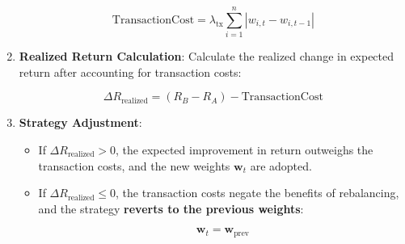 \begin{enumerate}
    \[
    \text{TransactionCost} = \lambda_{\text{tx}} \sum_{i=1}^n |w_{i, t} - w_{i, t-1}|
    \]

    \item \textbf{Realized Return Calculation}: Calculate the realized change in expected return after accounting for transaction costs:

    \[
    \Delta R_{\text{realized}} = (R_B - R_A) - \text{TransactionCost}
    \]

    \item \textbf{Strategy Adjustment}:
    \begin{itemize}
        \item If \( \Delta R_{\text{realized}} > 0 \), the expected improvement in return outweighs the transaction costs, and the new weights \( \mathbf{w}_t \) are adopted.
        \item If \( \Delta R_{\text{realized}} \leq 0 \), the transaction costs negate the benefits of rebalancing, and the strategy \textbf{reverts to the previous weights}:

        \[
        \mathbf{w}_t = \mathbf{w}_{\text{prev}}
        \]
    \end{itemize}
\end{enumerate}

